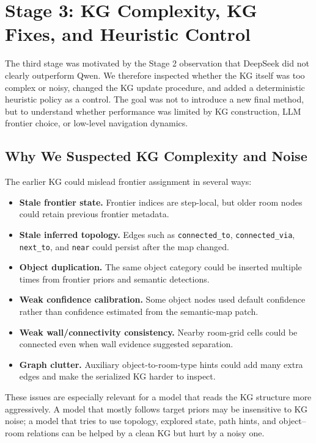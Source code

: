 \documentclass[11pt]{article}
\begin{document}
\section{Stage 3: KG Complexity, KG Fixes, and Heuristic Control}

The third stage was motivated by the Stage 2 observation that DeepSeek did not
clearly outperform Qwen. We therefore inspected whether the KG itself was too
complex or noisy, changed the KG update procedure, and added a deterministic
heuristic policy as a control. The goal was not to introduce a new final method,
but to understand whether performance was limited by KG construction, LLM
frontier choice, or low-level navigation dynamics.

\subsection{Why We Suspected KG Complexity and Noise}

The earlier KG could mislead frontier assignment in several ways:
\begin{itemize}
    \item \textbf{Stale frontier state.} Frontier indices are step-local, but
    older room nodes could retain previous frontier metadata.
    \item \textbf{Stale inferred topology.} Edges such as
    \texttt{connected\_to}, \texttt{connected\_via}, \texttt{next\_to}, and
    \texttt{near} could persist after the map changed.
    \item \textbf{Object duplication.} The same object category could be
    inserted multiple times from frontier priors and semantic detections.
    \item \textbf{Weak confidence calibration.} Some object nodes used default
    confidence rather than confidence estimated from the semantic-map patch.
    \item \textbf{Weak wall/connectivity consistency.} Nearby room-grid cells
    could be connected even when wall evidence suggested separation.
    \item \textbf{Graph clutter.} Auxiliary object-to-room-type hints could add
    many extra edges and make the serialized KG harder to inspect.
\end{itemize}

These issues are especially relevant for a model that reads the KG structure
more aggressively. A model that mostly follows target priors may be insensitive
to KG noise; a model that tries to use topology, explored state, path hints, and
object--room relations can be helped by a clean KG but hurt by a noisy one.
\end{document}
